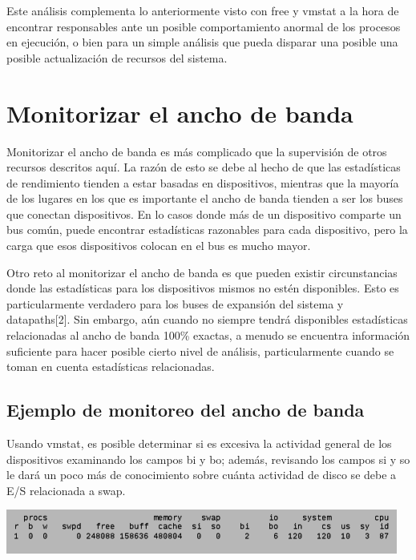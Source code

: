 \documentclass[12pt]{article}
\begin{document}
Este análisis complementa lo anteriormente visto con free y vmstat a la
hora de encontrar responsables ante un posible comportamiento anormal 
de los procesos en ejecución, o bien para un simple análisis que pueda 
disparar una posible una posible actualización de recursos del sistema. 

\section*{Monitorizar el ancho de banda}
Monitorizar el ancho de banda es más complicado que la supervisión de otros recursos descritos aquí. La razón de esto se debe al hecho de que las estadísticas de rendimiento tienden a estar basadas en dispositivos, mientras que la mayoría de los lugares en los que es importante el ancho de banda tienden a ser los buses que conectan dispositivos. En lo casos donde más de un dispositivo comparte un bus común, puede encontrar estadísticas razonables para cada dispositivo, pero la carga que esos dispositivos colocan en el bus es mucho mayor.

Otro reto al monitorizar el ancho de banda es que pueden existir circunstancias donde las estadísticas para los dispositivos mismos no estén disponibles. Esto es particularmente verdadero para los buses de expansión del sistema y datapaths[2]. Sin embargo, aún cuando no siempre tendrá disponibles estadísticas relacionadas al ancho de banda 100\% exactas, a menudo se encuentra información suficiente para hacer posible cierto nivel de análisis, particularmente cuando se toman en cuenta estadísticas relacionadas.

\subsection*{Ejemplo de monitoreo del ancho de banda}

Usando vmstat, es posible determinar si es excesiva la actividad general de los dispositivos examinando los campos bi y bo; además, revisando los campos si y so le dará un poco más de conocimiento sobre cuánta actividad de disco se debe a E/S relacionada a swap.

\begin{center}
 \includegraphics{vmstat1.png}
\end{center}
\end{document}
